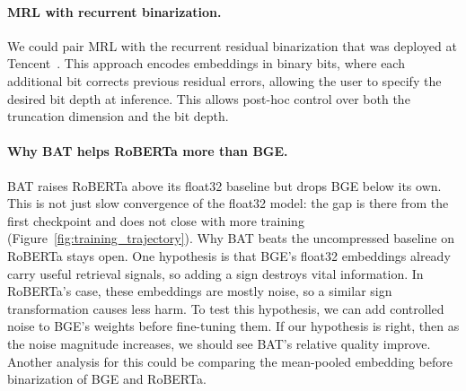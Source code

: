 \paragraph{MRL with recurrent binarization.}
We could pair MRL with the recurrent residual binarization that was
deployed at Tencent~\cite{gan2023binary}. This approach encodes
embeddings in binary bits, where each additional bit corrects previous
residual errors, allowing the user to specify the desired bit depth at
inference. This allows post-hoc control over both the truncation
dimension and the bit depth.

\paragraph{Why BAT helps RoBERTa more than BGE.}
BAT raises RoBERTa above its float32 baseline but drops BGE below its
own. This is not just slow convergence of the float32 model: the gap is
there from the first checkpoint and does not close with more training
(Figure~\ref{fig:training_trajectory}). Why BAT beats the uncompressed
baseline on RoBERTa stays open. One hypothesis is that BGE's float32
embeddings already carry useful retrieval signals, so adding a sign
destroys vital information.
In RoBERTa's case, these embeddings are mostly noise, so a similar
sign transformation causes less harm. To test this hypothesis, we can
add controlled noise to BGE's weights before fine-tuning them. If our
hypothesis is right, then as the noise magnitude increases, we should
see BAT's relative quality improve. Another analysis for this could be
comparing the mean-pooled embedding before binarization of BGE and
RoBERTa.